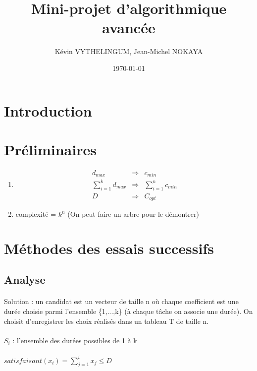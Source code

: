 \documentclass[a4paper, titlepage]{article}
\title{Mini-projet d'algorithmique avancée}      %
\author{Kévin VYTHELINGUM, Jean-Michel NOKAYA}           %
\date{\today}           %
\begin{document}
\maketitle
\tableofcontents
\newpage
\large

\section{Introduction}

\section{Préliminaires}

\begin{enumerate}
\item
	\begin{eqnarray*}
	d_{max} & \Rightarrow & c_{min} \\
	\sum_{i=1}^{k} d_{max} & \Rightarrow & \sum_{i=1}^{n} c_{min} \\
	D & \Rightarrow & C_{opt}
	\end{eqnarray*}
\item
	complexité = $k^{n}$ (On peut faire un arbre pour le démontrer)

\end{enumerate}

\section{Méthodes des essais successifs}

	\subsection{Analyse}

	\paragraph{} \noindent
	Solution : un candidat est un vecteur de taille n où chaque coefficient est une durée choisie parmi l'ensemble \{1,...,k\} (à chaque tâche on associe une durée).
	On choisit d'enregistrer les choix réalisés dans un tableau T de taille n.

	\paragraph{}\noindent
	$S_{i}$ : l'ensemble des durées possibles de 1 à k

	\paragraph{}\noindent
	$satisfaisant(x_{i}) = \sum_{j=1}^{i} x_{j} \le D$
\end{document}
